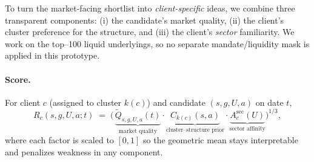 \documentclass[12pt,a4paper]{report}
\begin{document}
To turn the market-facing shortlist into \emph{client-specific} ideas, we combine three transparent components: (i) the candidate’s market quality, (ii) the client’s cluster preference for the structure, and (iii) the client’s \emph{sector} familiarity. We work on the top–100 liquid underlyings, so no separate mandate/liquidity mask is applied in this prototype.

\paragraph{Score.}
For client $c$ (assigned to cluster $k(c)$) and candidate $(s,g,U,a)$ on date $t$,
\[
R_c(s,g,U,a;t)\;=\;\Big(\,
\underbrace{\widetilde{Q}_{s,g,U,a}(t)}_{\text{market quality}}\cdot
\underbrace{C_{k(c)}(s,a)}_{\text{cluster--structure prior}}\cdot
\underbrace{A^{\mathrm{sec}}_c(U)}_{\text{sector affinity}}
\Big)^{\!1/3},
\]
where each factor is scaled to $[0,1]$ so the geometric mean stays interpretable and penalizes weakness in any component.
\end{document}
